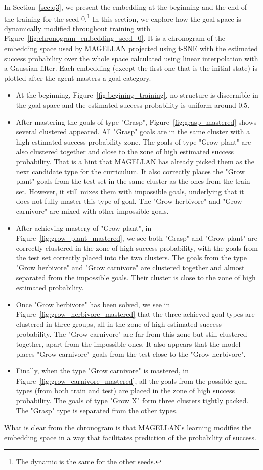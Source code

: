 In Section~\ref{sec:q3}, we present the embedding at the beginning and the end of the training for the seed $0$.\footnote{The dynamic is the same for the other seeds.} In this section, we explore how the goal space is dynamically modified throughout training with Figure~\ref{fig:chronogram_embedding_seed_0}. It is a chronogram of the embedding space used by MAGELLAN projected using t-SNE \cite{JMLR:v9:vandermaaten08a} with the estimated success probability over the whole space calculated using linear interpolation with a Gaussian filter. Each embedding (except the first one that is the initial state) is plotted after the agent masters a goal category.
\begin{itemize}
    \item At the beginning, Figure~\ref{fig:begining_training}, no structure is discernible in the goal space and the estimated success probability is uniform around $0.5$.
    \item After mastering the goals of type "Grasp", Figure~\ref{fig:grasp_mastered} shows several clustered appeared. All "Grasp" goals are in the same cluster with a high estimated success probability zone. The goals of type "Grow plant" are also clustered together and close to the zone of high estimated success probability. That is a hint that MAGELLAN has already picked them as the next candidate type for the curriculum. It also correctly places the "Grow plant" goals from the test set in the same cluster as the ones from the train set. However, it still mixes them with impossible goals, underlying that it does not fully master this type of goal.  The "Grow herbivore" and "Grow carnivore" are mixed with other impossible goals.
    \item After achieving mastery of "Grow plant", in Figure~\ref{fig:grow_plant_mastered}, we see both "Grasp" and "Grow plant" are correctly clustered in the zone of high success probability, with the goals from the test set correctly placed into the two clusters. The goals from the type "Grow herbivore" and "Grow carnivore" are clustered together and almost separated from the impossible goals. Their cluster is close to the zone of high estimated probability.
    \item Once "Grow herbivore" has been solved, we see in Figure~\ref{fig:grow_herbivore_mastered} that the three achieved goal types are clustered in three groups, all in the zone of high estimated success probability. The "Grow carnivore" are far from this zone but still clustered together, apart from the impossible ones. It also appears that the model places "Grow carnivore" goals from the test close to the "Grow herbivore". 
    \item Finally, when the type "Grow carnivore" is mastered, in Figure~\ref{fig:grow_carnivore_mastered}, all the goals from the possible goal types (from both train and test) are placed in the zone of high success probability. The goals of type "Grow X" form three clusters tightly packed. The "Grasp" type is separated from the other types.
\end{itemize}
 What is clear from the chronogram is that MAGELLAN's learning modifies the embedding space in a way that facilitates prediction of the probability of success.  

